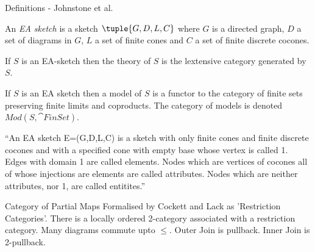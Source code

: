 \begin{frame}{Definitions - Johnstone et al.}

An \textit{EA sketch} is a sketch $\tuple{G,D,L,C}$ where $G$ is a directed graph, $D$ a set of diagrams in $G$, $L$ a set of finite cones and
$C$ a set of finite discrete cocones.

If $S$ is an EA-sketch then the theory of $S$ is the lextensive category generated by $S$.

If $S$ is an EA sketch then a model of $S$ is a functor to the category of finite sets preserving finite limits and coproducts.
The category of models is denoted $Mod(S,\cat{FinSet})$.
\end{frame}

\begin{frame}{\cite{Johnson2002ERA}}

``An EA sketch E=(G,D,L,C) is a sketch with only finite cones and finite discrete cocones and with a 
specified cone with empty base whose vertex is called 1. Edges with domain 1 are called elements. 
Nodes which are vertices of cocones all of whose injections are elements are called attributes. 
Nodes which are neither attributes, nor 1, are called entitites.''
\end{frame}

\begin{frame}{Category of Partial Maps}
Formalised by Cockett and Lack as 'Restriction Categories'.
There is a locally ordered 2-category associated with a restriction category.
Many diagrams commute upto $\leq$.
Outer Join is pullback.
Inner Join is 2-pullback.
\end{frame}

